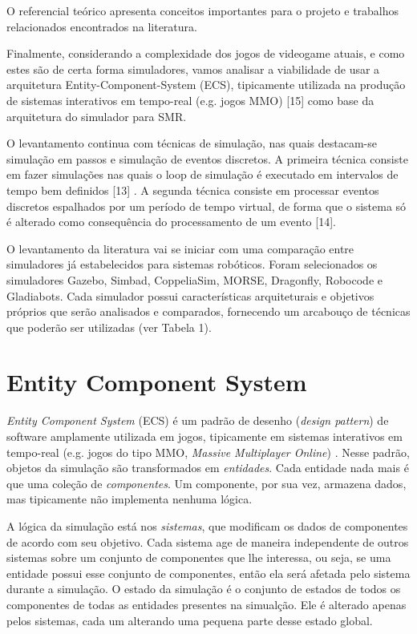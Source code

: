 \label{chapter:referencial}

O referencial teórico apresenta conceitos importantes para o projeto e trabalhos relacionados encontrados na literatura.

Finalmente, considerando a complexidade dos jogos de videogame atuais, e como estes são de certa forma simuladores, vamos analisar a viabilidade de usar a arquitetura Entity-Component-System (ECS), tipicamente utilizada na produção de sistemas interativos em tempo-real (e.g. jogos MMO) [15] como base da arquitetura do simulador para SMR.

O levantamento continua com técnicas de simulação, nas quais destacam-se simulação em passos e simulação de eventos discretos. A primeira técnica consiste em fazer simulações nas quais o loop de simulação é executado em intervalos de tempo bem definidos [13] . A segunda técnica consiste em processar eventos discretos espalhados por um período de tempo virtual, de forma que o sistema só é alterado como consequência do processamento de um evento [14].

O levantamento da literatura vai se iniciar com uma comparação entre simuladores já estabelecidos para sistemas robóticos. Foram selecionados os simuladores Gazebo, Simbad, CoppeliaSim, MORSE, Dragonfly, Robocode e Gladiabots. Cada simulador possui características arquiteturais e objetivos próprios que serão analisados e comparados, fornecendo um arcabouço de técnicas que poderão ser utilizadas (ver Tabela 1).

\section{Entity Component System}
\label{sec:ECS}

\textit{Entity Component System} (ECS) é um padrão de desenho (\textit{design pattern}) de software amplamente utilizada em jogos, tipicamente em sistemas interativos em tempo-real (e.g. jogos do tipo MMO, \textit{Massive Multiplayer Online}) \cite{wiebusch2015decoupling}. Nesse padrão, objetos da simulação são transformados em \textit{entidades}. Cada entidade nada mais é que uma coleção de \textit{componentes}. Um componente, por sua vez, armazena dados, mas tipicamente não implementa nenhuma lógica.

A lógica da simulação está nos \textit{sistemas}, que modificam os dados de componentes de acordo com seu objetivo. Cada sistema age de maneira independente de outros sistemas sobre um conjunto de componentes que lhe interessa, ou seja, se uma entidade possui esse conjunto de componentes, então ela será afetada pelo sistema durante a simulação. O estado da simulação é o conjunto de estados de todos os componentes de todas as entidades presentes na simualção. Ele é alterado apenas pelos sistemas, cada um alterando uma pequena parte desse estado global.

